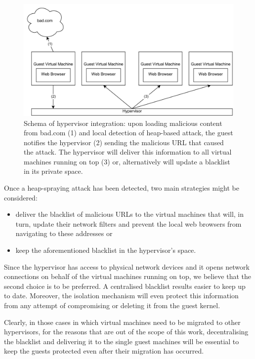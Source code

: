 \begin{figure}[t]
\begin{center}
\includegraphics[scale=0.55]{images/virtualDesktop.pdf}
\caption{{Schema of hypervisor integration: upon loading malicious content from bad.com (1) and local detection of  heap-based attack, the guest notifies the hypervisor (2) sending the malicious URL that caused the attack. The hypervisor will deliver this information to all virtual machines running on top (3) or, alternatively will update a blacklist in its private space.}}
\label{virtualdesktop}
\end{center}
\end{figure}


Once a heap-spraying attack has been detected, two main strategies might be considered:  

\begin{itemize}
\item deliver the blacklist of malicious URLs to the virtual machines that will, in turn, update their network filters and prevent the local web browsers from navigating to these addresses or 

\item keep the aforementioned blacklist in the hypervisor's space. 
\end{itemize}

Since the hypervisor has access to physical network devices and it opens network connections on behalf of the virtual machines running on top, we believe that the second choice is to be preferred. 
A centralised blacklist results easier to keep up to date. Moreover, the isolation mechanism will even protect this information from any attempt of compromising or deleting it from the guest kernel.
 
Clearly, in those cases in which virtual machines need to be migrated to other hypervisors, for the reasons that are out of the scope of this work, decentralising the blacklist and delivering it to the single guest machines will be essential to keep the guests protected even after their migration has occurred.

